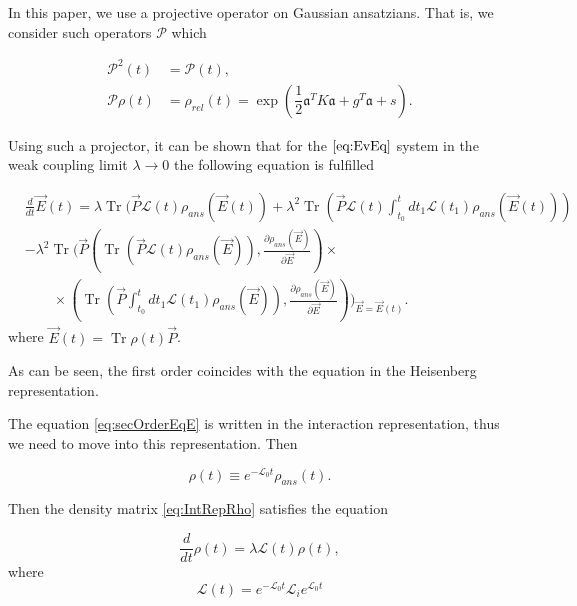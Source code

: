 \documentclass[12pt]{article}
\theoremstyle{definition}
\newcommand\Tr{\operatorname{Tr}}
\def\la {\lambda}
\begin{document}
	
	
	
	In this paper, we use a projective operator on Gaussian ansatzians. That is, we consider such operators $\mathcal{P}$ which
	
	\begin{align*}
		\mathcal{P}^2(t)& = \mathcal{P}(t), \\
		\mathcal{P}\rho(t)& = \rho_{rel}(t) = \exp(\dfrac{1}{2}\mathfrak{a}^TK\mathfrak{a} + g^T\mathfrak{a} + s).
	\end{align*}
	
	Using such a projector, it can be shown that for the $\ref{eq:EvEq}$ system in the weak coupling limit $\la \rightarrow 0$ the following equation is fulfilled
	
	\begin{align}
		&\frac{d}{dt} \vec{E}(t) = \lambda   \Tr ( \vec{P}\mathcal{L}(t)\rho_{ans} (\vec{E}(t) ) + \lambda^2 \Tr \left( \vec{P} \mathcal{L}(t)  \int_{t_0}^t dt_1 \mathcal{L}(t_1)\rho_{ans} (\vec{E}(t))   \right) \nonumber \\
		& 	-  \lambda^2 \Tr\Biggl( \vec{P} \left(\Tr (  \vec{P} \mathcal{L}(t)\rho_{ans} (\vec{E}) ) , \frac{\partial \rho_{ans}(\vec{E})}{\partial \vec{E}} \right) \times \nonumber\\
		& \qquad \times \left(\Tr (  \vec{P}\int_{t_0}^t dt_1\mathcal{L}(t_1)\rho_{ans} (\vec{E}) )  , \frac{\partial \rho_{ans}(\vec{E})}{\partial \vec{E}} \right) \Biggr)_{\vec{E} =\vec{E}(t) }. \label{eq:secOrderEqE}
	\end{align}
	where $\vec{E}(t) = \Tr\rho(t)\vec{P}$.
	
	As can be seen, the first order coincides with the equation in the Heisenberg representation.
	
	The equation \ref{eq:secOrderEqE} is written in the interaction representation, thus we need to move into this representation. Then
	
	\begin{equation}
		\label{eq:IntRepRho}
		\rho(t) \equiv e^{-\mathcal{L}_0t}\rho_{ans}(t).
	\end{equation}
	
	Then the density matrix \ref{eq:IntRepRho} satisfies the equation 
	
	\begin{equation}
		\label{eq:MainEq}
		\dfrac{d}{dt}\rho(t) = \la\mathcal{L}(t)\rho(t),
	\end{equation}
	where
	\begin{equation}
		\label{eq:IntRepL}
		\mathcal{L}(t) = e^{-\mathcal{L}_0t}\mathcal{L}_ie^{\mathcal{L}_0t}
	\end{equation}
	
\end{document}
